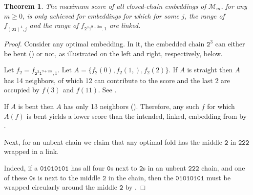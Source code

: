 \documentclass{article}
\newtheorem{theorem}{Theorem}
\newcommand{\mt}{\mathtt}
\begin{document}
\begin{theorem}\label{link-main}
	The maximum score of all closed-chain embeddings of $\mathscr M_m$, for any $m\ge 0$,
	is only achieved for embeddings for which for some $j$, the range of $f_{(\mt{01})^4,j}$ and the range of $f_{\mt{2}^3\mt{1}^{9+2m},1}$
	are linked.
\end{theorem}
\begin{proof}
Consider any optimal embedding.
In it, the embedded chain $\mt{2}^3$ can either be bent () or not, as illustrated on the left and right, respectively, below.


Let $f_2 = f_{\mt{2}^3\mt{1}^{9+2m},1}$.
Let $A=\{f_2(0),f_2(1,),f_2(2)\}$.
If $A$ is straight then $A$ has 14 neighbors,
of which 12 can contribute to the score and the last 2 are occupied by $f(3)$ and $f(11)$.
See .

If $A$ is bent then $A$ has only 13 neighbors ().
Therefore, any such $f$ for which $A(f)$ is bent yields a lower score than the intended, linked, embedding from 
by .

Next, for an unbent chain we claim that any optimal fold has the middle $\mt{2}$ in $\mt{222}$ wrapped in a link.

Indeed, if a $\mt{01010101}$ has all four $\mt{0}$s next to $\mt{2}$s in an unbent $\mt{222}$ chain,
and one of these $\mt 0$s is next to the middle $\mt 2$ in the chain, then the $\mt{01010101}$
must be wrapped circularly around the middle $\mt{2}$ by .
\end{proof}
\end{document}
